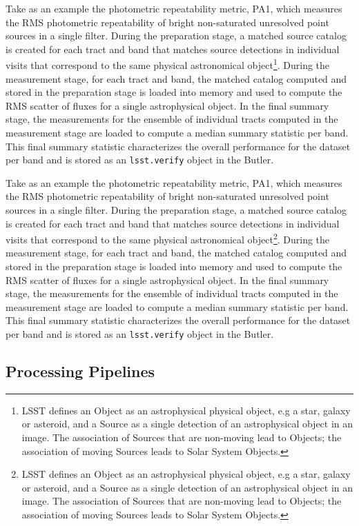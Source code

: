Take as an example the photometric repeatability metric, PA1, which measures the RMS photometric repeatability of bright non-saturated unresolved point sources in a single filter.
During the preparation stage, a matched source catalog is created for each tract and band that matches source detections in individual visits that correspond to the same physical astronomical object\footnote{LSST defines an Object as an astrophysical physical object, e.g a star, galaxy or asteroid, and a Source as a  single detection of an astrophysical object in an image. The association of Sources that are non-moving lead to Objects; the association of moving Sources leads to Solar System Objects.}. 
During the measurement stage, for each tract and band, the matched catalog computed and stored in the preparation stage is loaded into memory and used to compute the RMS scatter of fluxes for a single astrophysical object. 
In the final summary stage, the measurements for the ensemble of individual tracts computed in the measurement stage are loaded to compute a median summary statistic per band. 
This final summary statistic characterizes the overall performance for the dataset per band and is stored as an \texttt{lsst.verify} object in the Butler. 

Take as an example the photometric repeatability metric, PA1, which measures the RMS photometric repeatability of bright non-saturated unresolved point sources in a single filter.
During the preparation stage, a matched source catalog is created for each tract and band that matches source detections in individual visits that correspond to the same physical astronomical object\footnote{LSST defines an Object as an astrophysical physical object, e.g a star, galaxy or asteroid, and a Source as a  single detection of an astrophysical object in an image. The association of Sources that are non-moving lead to Objects; the association of moving Sources leads to Solar System Objects.}. 
During the measurement stage, for each tract and band, the matched catalog computed and stored in the preparation stage is loaded into memory and used to compute the RMS scatter of fluxes for a single astrophysical object. 
In the final summary stage, the measurements for the ensemble of individual tracts computed in the measurement stage are loaded to compute a median summary statistic per band. 
This final summary statistic characterizes the overall performance for the dataset per band and is stored as an \texttt{lsst.verify} object in the Butler. 


\subsection{Processing Pipelines} \label{ssec:pipelines}

